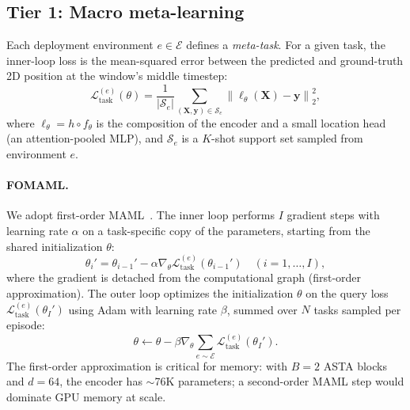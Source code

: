 \subsection{Tier 1: Macro meta-learning}
\label{sec:tier1}

Each deployment environment $e \in \mathcal{E}$ defines a
\emph{meta-task}. For a given task, the inner-loop loss is the
mean-squared error between the predicted and ground-truth 2D
position at the window's middle timestep:
\begin{equation}
  \mathcal{L}_{\mathrm{task}}^{(e)}(\theta)
  = \frac{1}{|\mathcal{S}_e|}
    \sum_{(\bm{X}, \bm{y}) \in \mathcal{S}_e}
    \left\| \ell_\theta(\bm{X}) - \bm{y} \right\|_2^2,
  \label{eq:task}
\end{equation}
where $\ell_\theta = h \circ f_\theta$ is the composition of the
encoder and a small location head (an attention-pooled MLP), and
$\mathcal{S}_e$ is a $K$-shot support set sampled from
environment $e$.

\paragraph{FOMAML.}
We adopt first-order MAML~\cite{maml2017}. The inner loop performs
$I$ gradient steps with learning rate $\alpha$ on a task-specific
copy of the parameters, starting from the shared initialization
$\theta$:
\begin{equation}
  \theta_i' = \theta_{i-1}' - \alpha \nabla_{\theta}
  \mathcal{L}_{\mathrm{task}}^{(e)}(\theta_{i-1}')
  \quad (i = 1,\dots,I),
  \label{eq:inner}
\end{equation}
where the gradient is detached from the computational graph
(first-order approximation). The outer loop optimizes the
initialization $\theta$ on the query loss
$\mathcal{L}_{\mathrm{task}}^{(e)}(\theta_I')$ using Adam with
learning rate $\beta$, summed over $N$ tasks sampled per episode:
\begin{equation}
  \theta \leftarrow \theta - \beta \nabla_\theta
  \sum_{e \sim \mathcal{E}} \mathcal{L}_{\mathrm{task}}^{(e)}(\theta_I').
  \label{eq:outer}
\end{equation}
The first-order approximation is critical for memory: with $B=2$
ASTA blocks and $d=64$, the encoder has $\sim$76K parameters;
a second-order MAML step would dominate GPU memory at scale.

